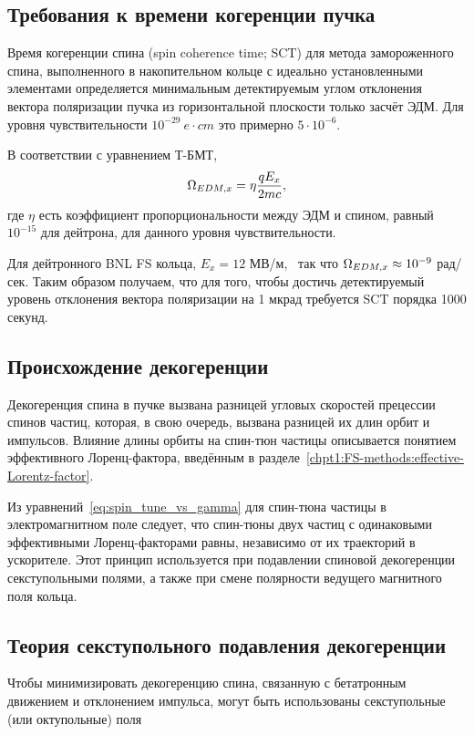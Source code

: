 

\subsection{Требования к времени когеренции пучка}
Время когеренции спина (spin coherence time; SCT) для метода
замороженного спина, выполненного в накопительном кольце с идеально
установленными элементами определяется минимальным детектируемым углом
отклонения вектора поляризации пучка из горизонтальной плоскости
только засчёт ЭДМ. Для уровня чувствительности $10^{-29}~e\cdot cm$
это примерно $5\cdot10^{-6}$.~\cite{BNL:Deuteron2008}

В соответствии с уравнением Т-БМТ,
\[
\Omega_{EDM,x} = \eta\frac{qE_x}{2mc},
\]
где $\eta$ есть коэффициент пропорциональности между ЭДМ и спином,
равный $10^{-15}$ для дейтрона, для данного уровня чувствительности.~\cite[стр.~206]{Eremey:Thesis}

Для дейтронного BNL FS кольца, $E_x = 12$
МВ/м,~\cite[стр.~19]{BNL:Deuteron2008} так что $\Omega_{EDM,x}\approx
10^{-9}$ рад/сек. Таким образом получаем, что для того, чтобы достичь
детектируемый уровень отклонения вектора поляризации на 1 мкрад требуется SCT порядка 1000 секунд.~\cite[стр.~207]{Eremey:Thesis}
\subsection{Происхождение декогеренции}\label{sec:decoh:origin}
Декогеренция спина в пучке вызвана разницей угловых скоростей
прецессии спинов частиц, которая, в свою очередь, вызвана разницей
их длин орбит и импульсов. Влияние длины орбиты на спин-тюн частицы описывается 
понятием эффективного Лоренц-фактора, введённым в разделе~\ref{chpt1:FS-methods:effective-Lorentz-factor}.

Из уравнений~\eqref{eq:spin_tune_vs_gamma} для спин-тюна частицы в электромагнитном поле следует, 
что спин-тюны двух частиц с одинаковыми эффективными Лоренц-факторами равны, независимо от их траекторий в ускорителе. Этот принцип используется при подавлении спиновой декогеренции секступольными полями, а также при смене полярности ведущего магнитного поля кольца.

\subsection{Теория секступольного подавления декогеренции}\label{sec:sextupole_spin_dec_solution}
Чтобы минимизировать декогеренцию спина, связанную с бетатронным
движением и отклонением импульса, могут быть использованы
секступольные (или октупольные) поля~\cite[стр.~212]{Eremey:Thesis}

